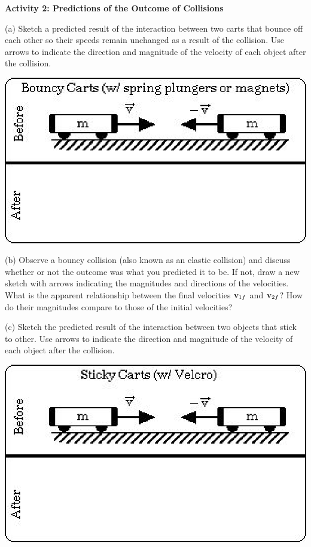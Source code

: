 \textbf{Activity 2: Predictions of the Outcome of Collisions }

(a) Sketch a predicted result of the interaction between two carts that bounce
off each other so their speeds remain unchanged as a result of the collision.
Use arrows to indicate the direction and magnitude of the velocity of each object
after the collision.

\vspace{0.3cm}
{\par\centering \includegraphics{mom_cons_fig3.eps} \par}
\vspace{0.3cm}

(b) Observe a bouncy collision (also known as an elastic collision) and discuss
whether or not the outcome was what you predicted it to be. If not, draw a new
sketch with arrows indicating the magnitudes and directions of the velocities.
What is the apparent relationship between the final velocities \( {{\bf v}_{1f}} \)
and \( {{\bf v}_{2f}} \)? How do their magnitudes compare to those
of the initial velocities?
\vspace{20mm}

(c) Sketch the predicted result of the interaction between two objects that
stick to other. Use arrows to indicate the direction and magnitude of the velocity
of each object after the collision.

\vspace{0.3cm}
{\par\centering \includegraphics{mom_cons_fig4.eps} \par}
\vspace{0.3cm}


